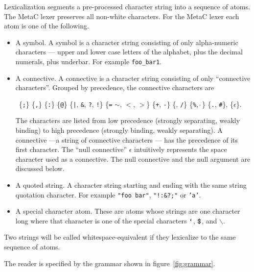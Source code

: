 \documentclass{article}
\newcommand{\mtt}[1]{\mbox{\tt #1}}
\begin{document}
Lexicalization segments a pre-processed character string into a sequence of atoms.
The MetaC lexer preserves all non-white characters.  For the MetaC lexer each atom is one of the following.

\begin{itemize}
\item A symbol.  A symbol is a character string consisting of only alpha-numeric characters --- upper and lower case letters of the alphabet, plus the decimal numerals, plus underbar.
  For example {\tt foo\_bar1}.
\item A connective.  A connective is a character string consisting of only ``connective characters''.
  Grouped by precedence, the connective characters are
  
  \medskip
  \centerline{~\;\;\;\;\;\;\{\mtt{;}\} \{\mtt{,}\} \{\mtt{:}\} \{\mtt{@}\}
  \{{\tt |}, {\tt \&}, {\tt ?}, {\tt !}\} \{{\tt =} {\tt $\sim$}, {\tt $<$}, {\tt $>$}\} \{{\tt +}, {\tt -}\}
  \{{\tt *}, {\tt /}\} \{{\tt \%}, $\hat{~}$\} \{{\tt .}, {\tt \#}\}, \{$\epsilon$\}.}
  
  \medskip
  The characters are listed from low precedence (strongly separating, weakly binding) to high precedence (strongly binding, weakly separating). A connective
  ---a string of connective characters --- has the precedence of its first character.  The ``null connective'' $\epsilon$
  intuitively represents the space character used as a connective.  The null connective and the null argument are discussed below.
\item A quoted string.  A character string starting and ending with the same string quotation character.  For example {\tt "foo bar"}, {\tt "!:\&?;"} or {\tt 'a'}.
\item A special character atom. These are atoms whose strings are one character long where that character is one of
  the special characters $\mtt{`}$, $\mtt{\$}$, and $\backslash$.
\end{itemize}

Two strings will be called whitespace-equivalent if they lexicalize to the same sequence of atoms.

\newcommand{\sym}{\mathrm{SYM}}
\newcommand{\conn}{\mathrm{CONN}}
\newcommand{\quot}{\mathrm{QUOTE}}
\newcommand{\misc}{\mathrm{MISC}}
\newcommand{\app}{\mathrm{APP}}
\newcommand{\var}{\mathrm{VAR}}


The reader is specified by the grammar shown in figure~\ref{fig:grammar}.
\end{document}
